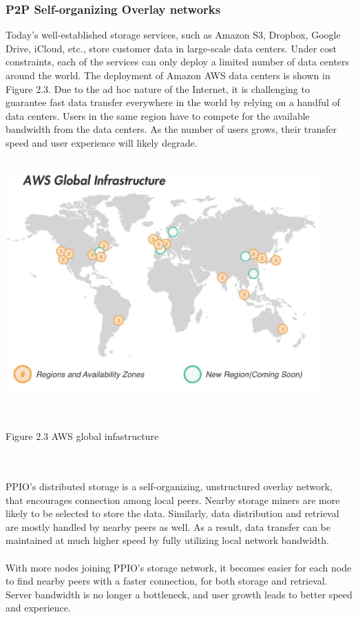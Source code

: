 \documentclass[10pt,a4paper]{article}
\begin{document}
         \subsubsection{P2P Self-organizing Overlay networks}  %
         \vspace{-0.5em}
Today’s well-established storage services, such as Amazon S3, Dropbox, Google Drive, iCloud, etc., store customer data in large-scale data centers. Under cost constraints, each of the services can only deploy a limited number of data centers around the world. The deployment of Amazon AWS data centers is shown in Figure 2.3. Due to the ad hoc nature of the Internet, it is challenging to guarantee fast data transfer everywhere in the world by relying on a handful of data centers. Users in the same region have to compete for the available bandwidth from the data centers. As the number of users grows, their transfer speed and user experience will likely degrade.
\vspace{-0.5em}
 \\ \\ \centerline{\includegraphics[width=340pt]{fig3}}
\\ \centerline{{Figure 2.3 AWS global infastructure}}
\\ \\ PPIO’s distributed storage is a self-organizing, unstructured overlay network, that encourages connection among local peers. Nearby storage miners are more likely to be selected to store the data. Similarly, data distribution and retrieval are mostly handled by nearby peers as well. As a result, data transfer can be maintained at much higher speed by fully utilizing local network bandwidth.
\vspace{-0.5em}
\\ \\With more nodes joining PPIO’s storage network, it becomes easier for each node to find nearby peers with a faster connection, for both storage and retrieval. Server bandwidth is no longer a bottleneck, and user growth leads to better speed and experience.
\end{document}
